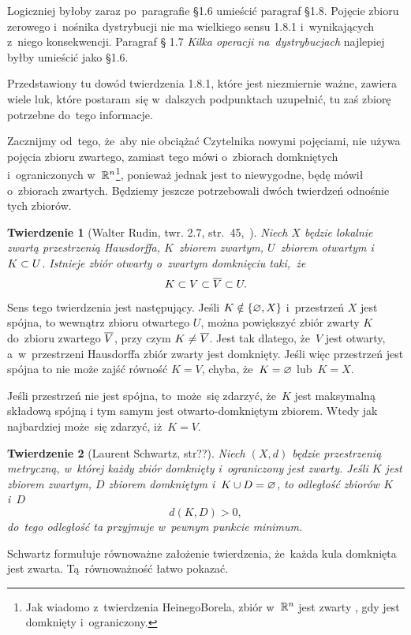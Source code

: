 \documentclass[a4paper,11pt]{article}
\newtheorem{twr}{Twierdzenie} %
\begin{document}
\start {} Logiczniej byłoby zaraz po~paragrafie \S 1.6 umieścić
paragraf \S 1.8. Pojęcie zbioru zerowego i~nośnika dystrybucji nie ma
wielkiego sensu 1.8.1 i~wynikających z~niego konsekwencji. Paragraf \S
1.7 \emph{Kilka operacji na~dystrybucjach} najlepiej byłby umieścić
jako \S 1.6.

\start {} Przedstawiony tu dowód twierdzenia 1.8.1, które
jest niezmiernie ważne, zawiera wiele luk, które postaram~się
w~dalszych podpunktach uzupełnić, tu zaś zbiorę potrzebne do~tego
informacje.

Zacznijmy od~tego, że~aby nie obciążać Czytelnika nowymi pojęciami,
nie używa pojęcia zbioru zwartego, zamiast tego mówi o~zbiorach
domkniętych i~ograniczonych w~$\mathbb{ R }^{ n }$\footnote{Jak wiadomo z~twierdzenia
  Heinego\dywiz Borela, zbiór w~$\mathbb{ R }^{ n }$ jest zwarty \wtw, gdy jest
  domknięty i~ograniczony.}, ponieważ jednak jest to niewygodne, będę
mówił o~zbiorach zwartych. Będziemy jeszcze potrzebowali dwóch
twierdzeń odnośnie tych zbiorów.

\begin{twr}[Walter Rudin, twr. 2.7, str.~45,~\cite{Rud98}]
  \label{twr:Zem-s01-01}
  Niech $X$ będzie lokalnie zwartą przestrzenią Hausdorffa,
  $K$~zbiorem zwartym, $U$~zbiorem otwartym i~$K \subset U$. Istnieje
  zbiór otwarty o~zwartym domknięciu taki,~że
  \begin{equation}
    \label{eq:Zem-s01-04}
    K \subset V \subset \overline{ V } \subset U.
  \end{equation}
\end{twr}
Sens tego twierdzenia jest następujący. Jeśli $K \notin \{ \varnothing, X \}$
i~przestrzeń $X$ jest spójna, to wewnątrz zbioru otwartego $U$, można
powiększyć zbiór zwarty $K$ do~zbioru zwartego $\overline{ V }$, przy czym
$K \neq \overline{ V }$. Jest tak dlatego, że~$V$ jest otwarty,
a~w~przestrzeni Hausdorffa zbiór zwarty jest domknięty. Jeśli więc
przestrzeń jest spójna to nie może zajść równość $K = V$, chyba,
że~$K = \varnothing$ lub~$K = X$.

Jeśli przestrzeń nie jest spójna, to~może~się zdarzyć, że~$K$ jest
maksymalną składową spójną i tym samym jest otwarto-domkniętym
zbiorem. Wtedy jak najbardziej może~się zdarzyć, iż~$K = V$.

\begin{twr}[Laurent Schwartz, str??\cite{Sch79}]
  \label{twr:Zem-s01-02}
  Niech $( X, d )$ będzie przestrzenią metryczną, w~której każdy zbiór
  domknięty i~ograniczony jest zwarty. Jeśli $K$ jest zbiorem zwartym,
  $D$ zbiorem domkniętym i~$K \cup D = \varnothing$, to odległość zbiorów $K$
  i~$D$
  \begin{equation}
    \label{eq:Zem-s01-05}
    d( K, D ) > 0,
  \end{equation}
  do~tego odległość ta przyjmuje w~pewnym punkcie minimum.
\end{twr}
\noi Schwartz formułuje równoważne założenie twierdzenia, że~każda
kula domknięta jest zwarta. Tą~równoważność łatwo pokazać.
\end{document}
